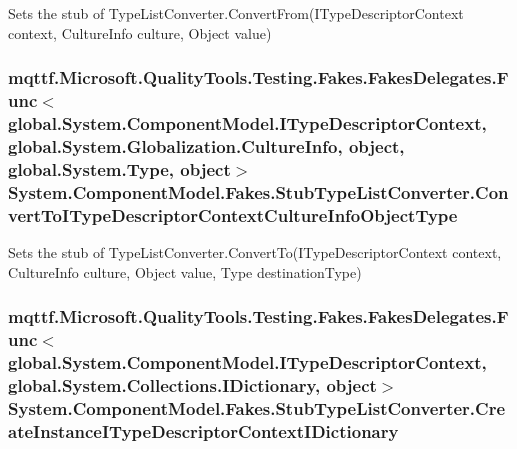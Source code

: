 Sets the stub of Type\-List\-Converter.\-Convert\-From(\-I\-Type\-Descriptor\-Context context, Culture\-Info culture, Object value)

\hypertarget{class_system_1_1_component_model_1_1_fakes_1_1_stub_type_list_converter_adebd34601244d6653b252b6e7ea088f3}{
\subsubsection[{Convert\-To\-I\-Type\-Descriptor\-Context\-Culture\-Info\-Object\-Type}]{\setlength{\rightskip}{0pt plus 5cm}mqttf.\-Microsoft.\-Quality\-Tools.\-Testing.\-Fakes.\-Fakes\-Delegates.\-Func$<$global.\-System.\-Component\-Model.\-I\-Type\-Descriptor\-Context, global.\-System.\-Globalization.\-Culture\-Info, object, global.\-System.\-Type, object$>$ System.\-Component\-Model.\-Fakes.\-Stub\-Type\-List\-Converter.\-Convert\-To\-I\-Type\-Descriptor\-Context\-Culture\-Info\-Object\-Type}}\label{class_system_1_1_component_model_1_1_fakes_1_1_stub_type_list_converter_adebd34601244d6653b252b6e7ea088f3}


Sets the stub of Type\-List\-Converter.\-Convert\-To(\-I\-Type\-Descriptor\-Context context, Culture\-Info culture, Object value, Type destination\-Type)

\hypertarget{class_system_1_1_component_model_1_1_fakes_1_1_stub_type_list_converter_a324aaf611218d57930bebf4c4289b14c}{
\subsubsection[{Create\-Instance\-I\-Type\-Descriptor\-Context\-I\-Dictionary}]{\setlength{\rightskip}{0pt plus 5cm}mqttf.\-Microsoft.\-Quality\-Tools.\-Testing.\-Fakes.\-Fakes\-Delegates.\-Func$<$global.\-System.\-Component\-Model.\-I\-Type\-Descriptor\-Context, global.\-System.\-Collections.\-I\-Dictionary, object$>$ System.\-Component\-Model.\-Fakes.\-Stub\-Type\-List\-Converter.\-Create\-Instance\-I\-Type\-Descriptor\-Context\-I\-Dictionary}}\label{class_system_1_1_component_model_1_1_fakes_1_1_stub_type_list_converter_a324aaf611218d57930bebf4c4289b14c}


